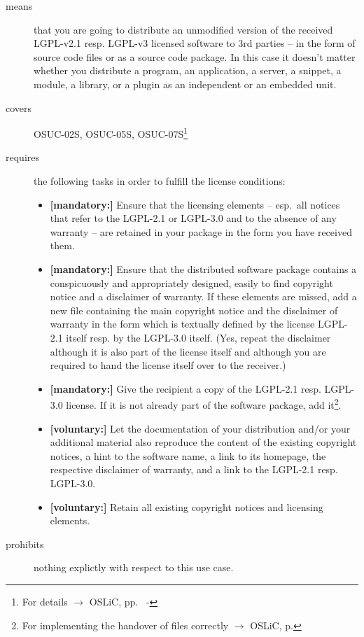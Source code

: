 \begin{description}

\item[means] that you are going to distribute an unmodified version of the
received LGPL-v2.1 resp. LGPL-v3 licensed software to 3rd parties -- in the form
of source code files or as a source code package. In this case it doesn't matter
whether you distribute a program, an application, a server, a snippet, a module,
a library, or a plugin as an independent or an embedded unit.

\item[covers] OSUC-02S, OSUC-05S, OSUC-07S\footnote{For details $\rightarrow$
OSLiC, pp.\ \pageref{OSUC-02S-DEF} - \pageref{OSUC-07S-DEF}}

\item[requires] the following tasks in order to fulfill the license conditions:
\begin{itemize}
 
  \item \textbf{[mandatory:]} Ensure that the licensing elements -- esp.\ all
  notices that refer to the LGPL-2.1 or LGPL-3.0 and to the absence of any
  warranty -- are retained in your package in the form you have received them.

  \item \textbf{[mandatory:]} Ensure that the distributed software package
  contains a conspicuously and appropriately designed, easily to find copyright
  notice and a disclaimer of warranty. If these elements are missed, add a new
  file containing the main copyright notice and the disclaimer of warranty in the
  form which is textually defined by the license LGPL-2.1 itself resp. by the
  LGPL-3.0 itself. (Yes, repeat the disclaimer although it is also part of the
  license itself and although you are required to hand the license itself over
  to the receiver.)
  
  \item \textbf{[mandatory:]} Give the recipient a copy of the LGPL-2.1 resp.
  LGPL-3.0 license. If it is not already part of the software package, add
  it\footnote{For implementing the handover of files correctly $\rightarrow$
  OSLiC, p. \pageref{DistributingFilesHint}}.
  
  \item \textbf{[voluntary:]} Let the documentation of your distribution and/or
  your additional material also reproduce the content of the existing
  copyright notices, a hint to the software name, a link to its homepage,
  the respective disclaimer of warranty, and a link to the LGPL-2.1 resp.
  LGPL-3.0.
  
  \item \textbf{[voluntary:]} Retain all existing copyright notices and
  licensing elements.
  
\end{itemize}

\item[prohibits] nothing explictly with respect to this use case.

\end{description}


